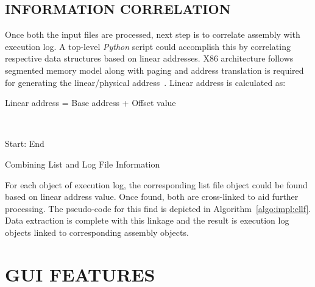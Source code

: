 \subsection {INFORMATION CORRELATION}

Once both the input files are processed, next step is to correlate assembly with execution log. A top-level {\it Python} script could accomplish this by correlating respective data structures based on linear addresses. X86 architecture follows segmented memory model along with paging and address translation is required for generating the linear/physical address~\citep{SS:AMD64-V2}. Linear address is calculated as:
\\
\centerline{Linear address = Base address + Offset value}
\\



\IncMargin{1em}
\begin{algorithm}[h]
\DontPrintSemicolon
{} 

\BlankLine
Start: \;
End \;
\caption{Combining List and Log File Information}
\label{algo:impl:cllf}
\end{algorithm}\DecMargin{1em}


For each object of execution log, the corresponding list file object could be found based on linear address value. Once found, both are cross-linked to aid further processing. The pseudo-code for this find is depicted in Algorithm~\ref{algo:impl:cllf}. Data extraction is complete with this linkage and the result is execution log objects linked to corresponding assembly objects.

\section {GUI FEATURES}

